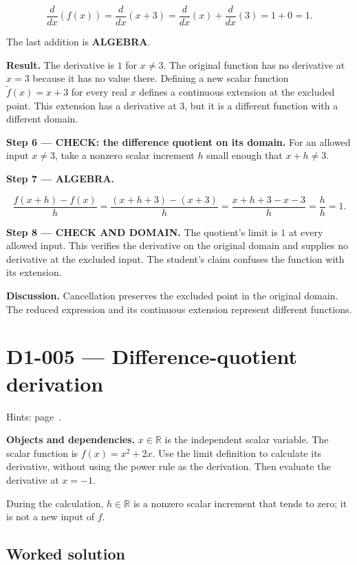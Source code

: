 \documentclass[11pt,oneside,openany]{book}
\begin{document}
\[
\frac{d}{dx}\left(f(x)\right)
=\frac{d}{dx}\left(x+3\right)
=\frac{d}{dx}\left(x\right)+\frac{d}{dx}\left(3\right)
=1+0=1.
\]

The last addition is \textbf{ALGEBRA}.

\textbf{Result.} The derivative is \(1\) for \(x\ne3\). The original function has no
derivative at \(x=3\) because it has no value there. Defining a new scalar function
\(\widetilde f(x)=x+3\) for every real \(x\) defines a continuous extension at the excluded point. This extension has a
derivative at \(3\), but it is a different function with a different domain.

\textbf{Step 6 --- CHECK: the difference quotient on its domain.} For an allowed
input \(x\ne3\), take a nonzero scalar increment \(h\) small enough that \(x+h\ne3\).

\begingroup\color{AlgebraBlue}
\textbf{Step 7 --- ALGEBRA.}

\[
\frac{f(x+h)-f(x)}{h}
=\frac{(x+h+3)-(x+3)}{h}
=\frac{x+h+3-x-3}{h}
=\frac{h}{h}=1.
\]

\endgroup
\begin{DomainStep}
\textbf{Step 8 --- CHECK AND DOMAIN.} The quotient's limit is \(1\) at every allowed input.
This verifies the derivative on the original domain and supplies no derivative
at the excluded input. The student's claim confuses the function with its extension.

\end{DomainStep}
\textbf{Discussion.} Cancellation preserves the excluded point in the original domain.
The reduced expression and its continuous extension represent different functions.
\clearpage
\section{D1-005 --- Difference-quotient derivation}
\label{problem:D1-005}
{\small Hints: page~\pageref{hints:D1-005}.}\par\medskip

\textbf{Objects and dependencies.} \(x\in\mathbb R\) is the independent scalar variable.
The scalar function is \(f(x)=x^2+2x\). Use the limit definition to calculate its
derivative, without using the power rule as the derivation. Then evaluate the
derivative at \(x=-1\).

During the calculation, \(h\in\mathbb R\) is a nonzero scalar increment that tends
to zero; it is not a new input of \(f\).
\subsection*{Worked solution}
\end{document}
